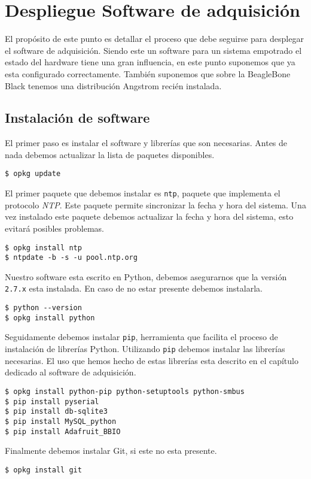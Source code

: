 \appendix

\chapter{Despliegue Software de adquisición}
	\label{app_soft}
	El propósito de este punto es detallar el proceso que debe seguirse para desplegar el software de adquisición. Siendo este un software para un
	sistema empotrado el estado del hardware tiene una gran influencia, en este punto suponemos que ya esta configurado correctamente. También
	suponemos que sobre la BeagleBone Black tenemos una distribución Angstrom recién instalada.
	\section{Instalación de software} 
		El primer paso es instalar el software y librerías que son necesarias. Antes de nada debemos actualizar la lista de paquetes
		disponibles. 
		\begin{lstlisting}[style=myBash]
$ opkg update
		\end{lstlisting}
		\par
		El primer paquete que debemos instalar es \texttt{ntp}, paquete que implementa el protocolo \emph{NTP}. Este paquete permite
		sincronizar la fecha y hora del sistema.  Una vez instalado este paquete debemos actualizar la fecha y hora del sistema, esto evitará
		posibles problemas.
		\begin{lstlisting}[style=myBash]
$ opkg install ntp
$ ntpdate -b -s -u pool.ntp.org
		\end{lstlisting}
		\par
		Nuestro software esta escrito en Python, debemos asegurarnos que la versión \texttt{2.7.x} esta instalada. En caso de no estar
		presente debemos instalarla.
		\begin{lstlisting}[style=myBash]
$ python --version
$ opkg install python
		\end{lstlisting}
		Seguidamente debemos instalar \texttt{pip}, herramienta que facilita el proceso de instalación de librerías Python.  Utilizando
		\texttt{pip} debemos instalar las librerías necesarias. El uso que hemos hecho de estas librerías esta descrito en el capítulo
		dedicado al software de adquisición.
		\begin{lstlisting}[style=myBash]
$ opkg install python-pip python-setuptools python-smbus
$ pip install pyserial
$ pip install db-sqlite3
$ pip install MySQL_python
$ pip install Adafruit_BBIO
		\end{lstlisting}
		\par
		Finalmente debemos instalar Git, si este no esta presente.
		\begin{lstlisting}[style=myBash]
$ opkg install git
		\end{lstlisting}
